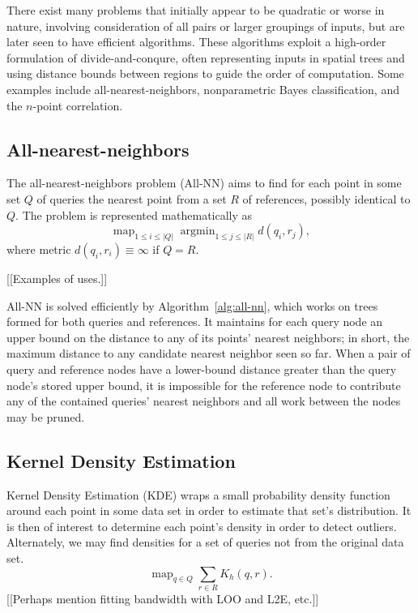 \documentclass{article}
\DeclareMathOperator*{\argmin}{argmin}
\DeclareMathOperator*{\map}{map}
\begin{document}

There exist many problems that initially appear to be quadratic or
worse in nature, involving consideration of all pairs or larger
groupings of inputs, but are later seen to have efficient algorithms.
These algorithms exploit a high-order formulation of
divide-and-conqure, often representing inputs in spatial trees and
using distance bounds between regions to guide the order of
computation.  Some examples include all-nearest-neighbors,
nonparametric Bayes classification, and the $n$-point correlation.

\subsection{All-nearest-neighbors}

The all-nearest-neighbors problem (All-NN) aims to find for each
point in some set $Q$ of queries the nearest point from a set $R$ of
references, possibly identical to $Q$.  The problem is represented
mathematically as
\[
\map_{1 \leq i \leq |Q|}\argmin_{1 \leq j \leq |R|} d(q_i,r_j),
\]
where metric $d(q_i,r_i) \equiv \infty$ if $Q = R$.

[[Examples of uses.]]

All-NN is solved efficiently by Algorithm~\ref{alg:all-nn}, which
works on trees formed for both queries and references.  It maintains
for each query node an upper bound on the distance to any of its
points' nearest neighbors; in short, the maximum distance to any
candidate nearest neighbor seen so far.  When a pair of query and
reference nodes have a lower-bound distance greater than the query
node's stored upper bound, it is impossible for the reference node to
contribute any of the contained queries' nearest neighbors and all
work between the nodes may be pruned.

\subsection{Kernel Density Estimation}

Kernel Density Estimation (KDE) wraps a small probability density
function around each point in some data set in order to estimate that
set's distribution.  It is then of interest to determine each point's
density in order to detect outliers.  Alternately, we may find
densities for a set of queries not from the original data set.
\[
\map_{q \in Q} \sum_{r \in R} K_h(q,r).
\]
[[Perhaps mention fitting bandwidth with LOO and L2E, etc.]]
\end{document}
